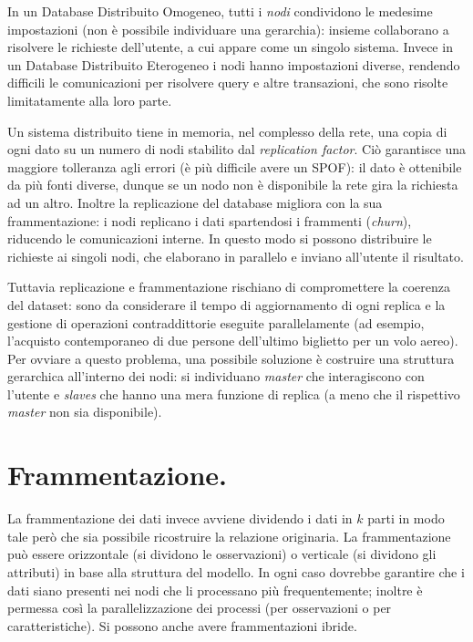 \documentclass[a4page, 11pt]{article}
\begin{document}
In un Database Distribuito Omogeneo, tutti i \textit{nodi} condividono le medesime impostazioni (non è possibile individuare una gerarchia): insieme collaborano a risolvere le richieste dell'utente, a cui appare come un singolo sistema.
Invece in un Database Distribuito Eterogeneo i nodi hanno impostazioni diverse, rendendo difficili le comunicazioni per risolvere query e altre transazioni, che sono risolte limitatamente alla loro parte.

Un sistema distribuito tiene in memoria, nel complesso della rete, una copia di ogni dato su un numero di nodi stabilito dal \textit{replication factor}.
Ciò garantisce una maggiore tolleranza agli errori (è più difficile avere un SPOF): il dato è ottenibile da più fonti diverse, dunque se un nodo non è disponibile la rete gira la richiesta ad un altro.
Inoltre la replicazione del database migliora con la sua frammentazione: i nodi replicano i dati spartendosi i frammenti (\textit{churn}), riducendo le comunicazioni interne.
In questo modo si possono distribuire le richieste ai singoli nodi, che elaborano in parallelo e inviano all'utente il risultato.

Tuttavia replicazione e frammentazione rischiano di compromettere la coerenza del dataset: sono da considerare il tempo di aggiornamento di ogni replica e la gestione di operazioni contraddittorie eseguite parallelamente (ad esempio, l'acquisto contemporaneo di due persone dell'ultimo biglietto per un volo aereo).
Per ovviare a questo problema, una possibile soluzione è costruire una struttura gerarchica all'interno dei nodi: si individuano \textit{master} che interagiscono con l'utente e \textit{slaves} che hanno una mera funzione di replica (a meno che il rispettivo \textit{master} non sia disponibile).

\section{Frammentazione.}
La frammentazione dei dati invece avviene dividendo i dati in $k$ parti in modo tale però che sia possibile ricostruire la relazione originaria.
La frammentazione può essere orizzontale (si dividono le osservazioni) o verticale (si dividono gli attributi) in base alla struttura del modello.
In ogni caso dovrebbe garantire che i dati siano presenti nei nodi che li processano più frequentemente; inoltre è permessa così la parallelizzazione dei processi (per osservazioni o per caratteristiche).
Si possono anche avere frammentazioni ibride.
\end{document}
